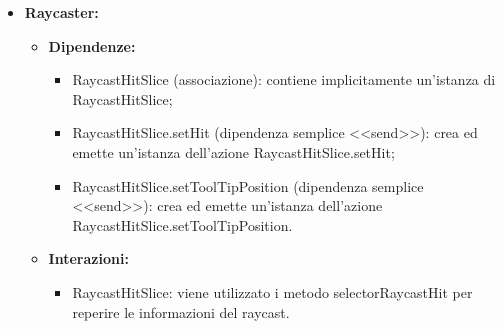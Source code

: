 \begin{itemize}
    \item \textbf{Raycaster:}
    \begin{itemize}
        \item \textbf{Dipendenze:}
        \begin{itemize}
            \item RaycastHitSlice (associazione):  contiene implicitamente un'istanza di RaycastHitSlice;
            \item RaycastHitSlice.setHit (dipendenza semplice <<send>>):  crea ed emette un’istanza dell’azione RaycastHitSlice.setHit;
            \item RaycastHitSlice.setToolTipPosition (dipendenza semplice <<send>>):  crea ed emette un’istanza dell’azione RaycastHitSlice.setToolTipPosition.
        \end{itemize} 
        \item \textbf{Interazioni:}
        \begin{itemize}
            \item RaycastHitSlice: viene utilizzato i metodo selectorRaycastHit per reperire le informazioni del raycast.
        \end{itemize}  
    \end{itemize}
\end{itemize}

